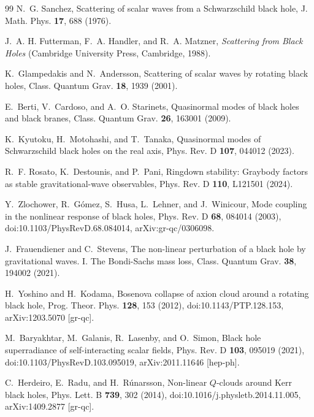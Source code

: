 \begin{thebibliography}{99}
N.~G. Sanchez,
Scattering of scalar waves from a Schwarzschild black hole,
J. Math. Phys. \textbf{17}, 688 (1976).

J.~A. H. Futterman, F.~A. Handler, and R.~A. Matzner,
\textit{Scattering from Black Holes}
(Cambridge University Press, Cambridge, 1988).

K.~Glampedakis and N.~Andersson,
Scattering of scalar waves by rotating black holes,
Class. Quantum Grav. \textbf{18}, 1939 (2001).

E.~Berti, V.~Cardoso, and A.~O. Starinets,
Quasinormal modes of black holes and black branes,
Class. Quantum Grav. \textbf{26}, 163001 (2009).

K.~Kyutoku, H.~Motohashi, and T.~Tanaka,
Quasinormal modes of Schwarzschild black holes on the real axis,
Phys. Rev. D \textbf{107}, 044012 (2023).

R.~F. Rosato, K.~Destounis, and P.~Pani,
Ringdown stability: Graybody factors as stable gravitational-wave observables,
Phys. Rev. D \textbf{110}, L121501 (2024).

Y.~Zlochower, R.~G\'omez, S.~Husa, L.~Lehner, and J.~Winicour,
Mode coupling in the nonlinear response of black holes,
Phys. Rev. D \textbf{68}, 084014 (2003),
doi:10.1103/PhysRevD.68.084014,
arXiv:gr-qc/0306098.

J.~Frauendiener and C.~Stevens,
The non-linear perturbation of a black hole by gravitational waves. I. The
Bondi-Sachs mass loss,
Class. Quantum Grav. \textbf{38}, 194002 (2021).

H.~Yoshino and H.~Kodama,
Bosenova collapse of axion cloud around a rotating black hole,
Prog. Theor. Phys. \textbf{128}, 153 (2012),
doi:10.1143/PTP.128.153,
arXiv:1203.5070 [gr-qc].

M.~Baryakhtar, M.~Galanis, R.~Lasenby, and O.~Simon,
Black hole superradiance of self-interacting scalar fields,
Phys. Rev. D \textbf{103}, 095019 (2021),
doi:10.1103/PhysRevD.103.095019,
arXiv:2011.11646 [hep-ph].

C.~Herdeiro, E.~Radu, and H.~R\'unarsson,
Non-linear $Q$-clouds around Kerr black holes,
Phys. Lett. B \textbf{739}, 302 (2014),
doi:10.1016/j.physletb.2014.11.005,
arXiv:1409.2877 [gr-qc].


\end{thebibliography}
